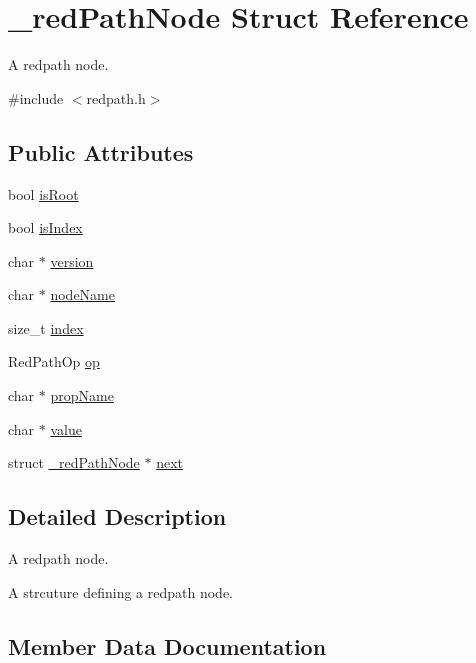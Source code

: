\hypertarget{struct__redPathNode}{}\section{\+\_\+red\+Path\+Node Struct Reference}
\label{struct__redPathNode}


A redpath node.  




{\ttfamily \#include $<$redpath.\+h$>$}

\subsection*{Public Attributes}
\begin{DoxyCompactItemize}
\item 
bool \hyperlink{struct__redPathNode_aeb09e1fb99b1806193adaa558ffa24d7}{is\+Root}
\item 
bool \hyperlink{struct__redPathNode_ad4acac474760bda797bcccd94265a916}{is\+Index}
\item 
char $\ast$ \hyperlink{struct__redPathNode_aca55747e397ba939a113e611bad76484}{version}
\item 
char $\ast$ \hyperlink{struct__redPathNode_a6ac5cdab29eebd1a6f0f24931a6578d3}{node\+Name}
\item 
size\+\_\+t \hyperlink{struct__redPathNode_a38c274bebcf1411cf473c561d4171732}{index}
\item 
Red\+Path\+Op \hyperlink{struct__redPathNode_aa21623b64c9fec7341109f52911475b3}{op}
\item 
char $\ast$ \hyperlink{struct__redPathNode_ac2ebde308389a766045538cfecfba214}{prop\+Name}
\item 
char $\ast$ \hyperlink{struct__redPathNode_a492a339d2938c3354cd3c5cbfcd9075b}{value}
\item 
struct \hyperlink{struct__redPathNode}{\+\_\+red\+Path\+Node} $\ast$ \hyperlink{struct__redPathNode_ac40678642805053a5c301534e14538b9}{next}
\end{DoxyCompactItemize}


\subsection{Detailed Description}
A redpath node. 

A strcuture defining a redpath node. 

\subsection{Member Data Documentation}
\mbox{\label{struct__redPathNode_a38c274bebcf1411cf473c561d4171732}} 
